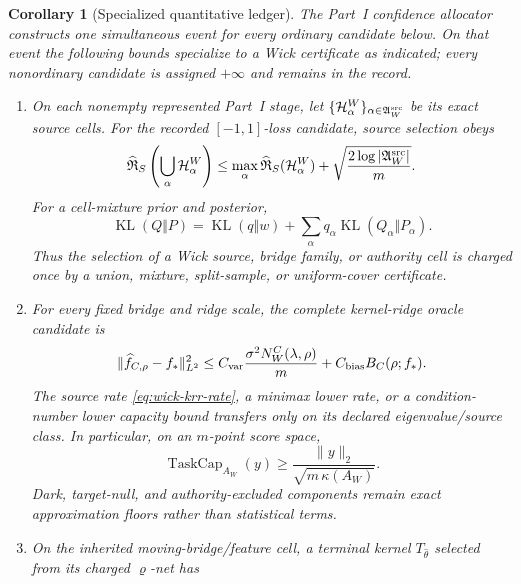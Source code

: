 \documentclass[11pt]{article}
\numberwithin{section}{part}
\theoremstyle{plain}
\newtheorem{corollary}[corollary]{Corollary}
\theoremstyle{definition}
\theoremstyle{remark}
\begin{document}
\begin{corollary}[Specialized quantitative ledger]
\label{cor:wick-quantitative-ledger}
The Part~I confidence allocator constructs one simultaneous event for every
ordinary candidate below.  On that event the following bounds specialize to
a Wick certificate as indicated; every nonordinary candidate is assigned
\(+\infty\) and remains in the record.
\begin{enumerate}[label=\textup{(\roman*)}]
\item On each nonempty represented Part~I stage, let
\(\{\mathcal H_\alpha^W\}_{\alpha\in\mathfrak A_W^{\rm src}}\) be its exact
source cells.  For the recorded \([-1,1]\)-loss candidate, source selection
obeys
\begin{equation}
 \label{eq:wick-source-cell-union}
 \widehat{\mathfrak R}_S
 \left(\bigcup_\alpha\mathcal H_\alpha^W\right)
 \le\max_\alpha\widehat{\mathfrak R}_S(\mathcal H_\alpha^W)
 +\sqrt{\frac{2\log|\mathfrak A_W^{\rm src}|}{m}}.
\end{equation}
For a cell-mixture prior and posterior,
\begin{equation}
 \label{eq:wick-source-cell-pac-bayes}
 \operatorname{KL}(Q\Vert P)
 =\operatorname{KL}(q\Vert w)
 +\sum_\alpha q_\alpha\operatorname{KL}(Q_\alpha\Vert P_\alpha).
\end{equation}
Thus the selection of a Wick source, bridge family, or authority cell is
charged once by a union, mixture, split-sample, or uniform-cover certificate.
\item For every fixed bridge and ridge scale, the complete kernel-ridge
oracle candidate is
\begin{equation}
 \label{eq:wick-krr-oracle}
 \|\widehat f_{C,\rho}-f_*\|_{L^2}^2
 \le C_{\rm var}\frac{\sigma^2N_W^C(\lambda,\rho)}m
 +C_{\rm bias}B_C(\rho;f_*).
\end{equation}
The source rate \eqref{eq:wick-krr-rate}, a minimax lower rate, or a
condition-number lower capacity bound transfers only on its declared
eigenvalue/source class.  In particular, on an \(m\)-point score space,
\begin{equation}
 \label{eq:wick-condition-capacity-lower}
 \operatorname{TaskCap}_{A_W}(y)
 \ge\frac{\|y\|_2}{\sqrt{m\,\kappa(A_W)}}.
\end{equation}
Dark, target-null, and authority-excluded components remain exact
approximation floors rather than statistical terms.
\item On the inherited moving-bridge/feature cell, a terminal kernel
\(T_{\widehat\theta}\) selected from its charged \(\varrho\)-net has

\end{enumerate}
\end{corollary}
\end{document}
